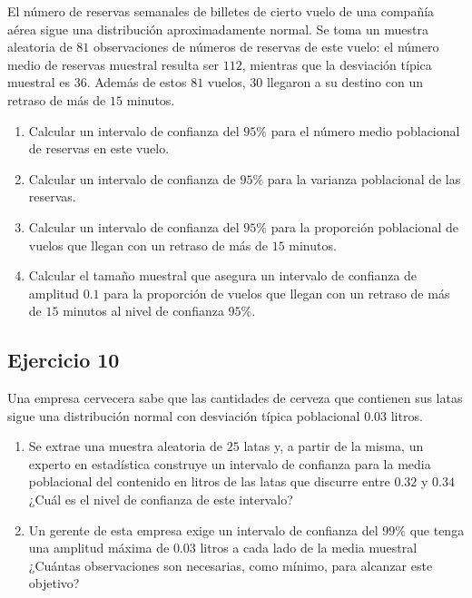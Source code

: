 \documentclass[
]{article}
\providecommand{\tightlist}{%
  \setlength{\itemsep}{0pt}\setlength{\parskip}{0pt}}
\begin{document}
El número de reservas semanales de billetes de cierto vuelo de una
compañía aérea sigue una distribución aproximadamente normal. Se toma un
muestra aleatoria de \(81\) observaciones de números de reservas de este
vuelo: el número medio de reservas muestral resulta ser \(112\),
mientras que la desviación típica muestral es \(36\). Además de estos
\(81\) vuelos, \(30\) llegaron a su destino con un retraso de más de
\(15\) minutos.

\begin{enumerate}
\def\labelenumi{\arabic{enumi}.}
\tightlist
\item
  Calcular un intervalo de confianza del \(95\%\) para el número medio
  poblacional de reservas en este vuelo.
\item
  Calcular un intervalo de confianza de \(95\%\) para la varianza
  poblacional de las reservas.
\item
  Calcular un intervalo de confianza del \(95\%\) para la proporción
  poblacional de vuelos que llegan con un retraso de más de \(15\)
  minutos.
\item
  Calcular el tamaño muestral que asegura un intervalo de confianza de
  amplitud \(0.1\) para la proporción de vuelos que llegan con un
  retraso de más de \(15\) minutos al nivel de confianza \(95\%\).
\end{enumerate}

\hypertarget{ejercicio-10}{%
\subsection{Ejercicio 10}\label{ejercicio-10}}

Una empresa cervecera sabe que las cantidades de cerveza que contienen
sus latas sigue una distribución normal con desviación típica
poblacional \(0.03\) litros.

\begin{enumerate}
\def\labelenumi{\arabic{enumi}.}
\tightlist
\item
  Se extrae una muestra aleatoria de \(25\) latas y, a partir de la
  misma, un experto en estadística construye un intervalo de confianza
  para la media poblacional del contenido en litros de las latas que
  discurre entre \(0.32\) y \(0.34\) ¿Cuál es el nivel de confianza de
  este intervalo?
\item
  Un gerente de esta empresa exige un intervalo de confianza del
  \(99\%\) que tenga una amplitud máxima de \(0.03\) litros a cada lado
  de la media muestral ¿Cuántas observaciones son necesarias, como
  mínimo, para alcanzar este objetivo? 
\end{enumerate}
\end{document}
